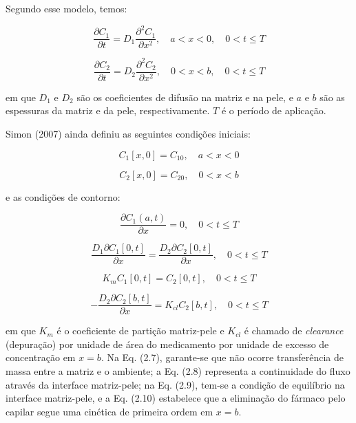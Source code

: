 Segundo esse modelo, temos:

\begin{equation}
\frac{\partial C_1}{\partial t} = D_1 \frac{\partial^2 C_1}{\partial x^2}, \quad a < x < 0, \quad 0 < t \leq T
\end{equation}

\begin{equation}
\frac{\partial C_2}{\partial t} = D_2 \frac{\partial^2 C_2}{\partial x^2}, \quad 0 < x < b, \quad 0 < t \leq T
\end{equation}

\noindent em que $D_1$ e $D_2$ são os coeficientes de difusão na matriz e na pele, e $a$ e $b$ são as espessuras da matriz e da pele, respectivamente. $T$ é o período de aplicação.

Simon (2007) ainda definiu as seguintes condições iniciais:

\begin{equation}
C_1[x,0] = C_{10}, \quad a < x < 0
\end{equation}

\begin{equation}
C_2[x,0] = C_{20}, \quad 0 < x < b
\end{equation}

\noindent e as condições de contorno:

\begin{equation}
\frac{\partial C_1(a,t)}{\partial x} = 0, \quad 0 < t \leq T
\end{equation}

\begin{equation}
\frac{D_1\partial C_1[0,t]}{\partial x} = \frac{D_2\partial C_2[0,t]}{\partial x}, \quad 0 < t \leq T
\end{equation}

\begin{equation}
K_m C_1[0,t] = C_2[0,t], \quad 0 < t \leq T
\end{equation}

\begin{equation}
- \frac{D_2\partial C_2[b,t]}{\partial x} = K_{cl}C_2[b,t], \quad 0 < t \leq T
\end{equation}

\noindent em que $K_m$ é o coeficiente de partição matriz-pele e $K_{cl}$ é chamado de \textit{clearance} (depuração) por unidade de área do medicamento por unidade de excesso de concentração em $x = b$. Na Eq. (2.7), garante-se que não ocorre transferência de massa entre a matriz e o ambiente; a Eq. (2.8) representa a continuidade do fluxo através da interface matriz-pele; na Eq. (2.9), tem-se a condição de equilíbrio na interface matriz-pele, e a Eq. (2.10) estabelece que a eliminação do fármaco pelo capilar segue uma cinética de primeira ordem em $x = b$.

